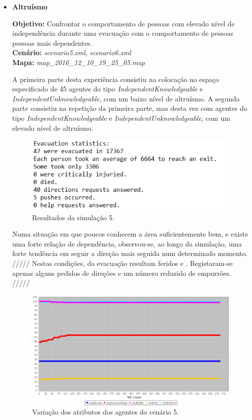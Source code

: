 \documentclass[12pt]{article}
\begin{document}
\begin{titlepage}
\begin{itemize}
\item \textbf{Altruísmo}

\textbf{Objetivo:} 
Confrontar o comportamento de pessoas com elevado nível de independência durante uma evacuação com o comportamento de pessoas pessoas mais dependentes.
\\\textbf{Cenário:} 
\textit{scenario5.xml}, \textit{scenario6.xml}
\\\textbf{Mapa:} 
\textit{map\_2016\_12\_10\_19\_25\_05.map}
\newline


A primeira parte desta experiência consistiu na colocação no espaço especificado de 45 agentes do tipo \textit{IndependentKnowledgeable} e \textit{IndependentUnknowledgeable}, com um baixo nível de altruísmo. A segunda parte consistiu na repetição da primeira parte, mas desta vez com agentes do tipo \textit{IndependentKnowledgeable} e \textit{IndependentUnknowledgeable}, com um elevado nível de altruísmo.

\begin{figure}[H]
	\centering
	\includegraphics{log_sc_alt1.png}
	\caption{Resultados da simulação 5.}
	\label{log_sc1}
\end{figure}

Numa situação em que poucos conhecem a área suficientemente bem, e existe uma forte relação de dependência, observou-se, ao longo da simulação, uma forte tendência em seguir a direção mais seguida num determinado momento.
/////
Nestas condições, da evacuação resultam feridos e . Registaram-se apenas alguns pedidos de direções e um número reduzido de empurrões.
/////

\begin{figure}[H]
	\centering
	\includegraphics{graph_sc_alt1.png}
	\caption{Variação dos atributos dos agentes do cenário 5.}
	\label{graph_sc1}
\end{figure}


\end{itemize}
\end{titlepage}
\end{document}
